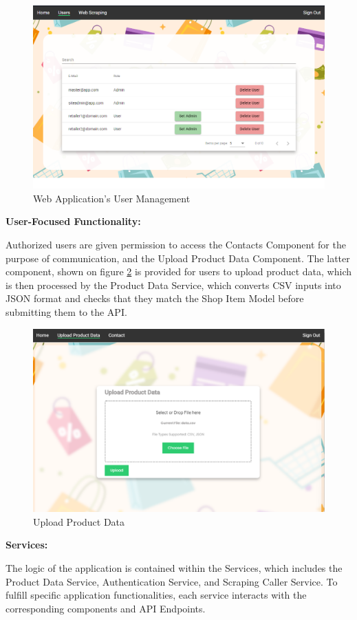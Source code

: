 \begin{figure}[H]
	\centering
	\includegraphics[width=0.8\linewidth]{img/users_ss.png}
	\caption{Web Application's User Management}
	\label{fig:umgmt}
\end{figure}

\noindent\textbf{User-Focused Functionality:}

Authorized users are given permission to access the Contacts Component for the purpose of communication, and the Upload Product Data Component. The latter component, shown on figure \ref{fig:uploaddata} is provided for users to upload product data, which is then processed by the Product Data Service, which converts CSV inputs into JSON format and checks that they match the Shop Item Model before submitting them to the API.

\begin{figure}[H]
	\centering
	\includegraphics[width=0.65\linewidth]{img/product_data_ss.png}
	\caption{Upload Product Data}
	\label{fig:uploaddata}
\end{figure}

\noindent\textbf{Services:} 

The logic of the application is contained within the Services, which includes the Product Data Service, Authentication Service, and Scraping Caller Service. To fulfill specific application functionalities, each service interacts with the corresponding components and API Endpoints.

